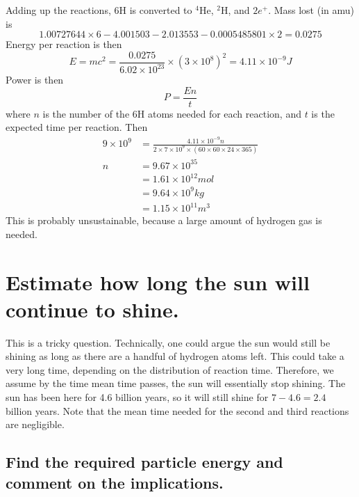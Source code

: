 \documentclass[answers]{exam}
\begin{document}
\begin{questions}
\begin{parts}
\begin{solution}
    Adding up the reactions, 6H is converted to $^4$He, $^2$H, and $2e^+$. Mass lost (in amu) is
    $$1.00727644 \times 6 - 4.001503 - 2.013553 - 0.0005485801 \times 2 = 0.0275$$
    Energy per reaction is then
    $$E = mc^2 = \frac{0.0275}{6.02\times10^{23}} \times (3\times10^8)^2 = 4.11 \times 10^{-9}\unit{J}$$
    Power is then
    $$P = \frac{En}{t}$$
    where $n$ is the number of the 6H atoms needed for each reaction, and $t$ is the expected time per reaction. Then
    \begin{align*}
        9\times10^9 &= \frac{4.11 \times 10^{-9}n}{2\times7\times10^9\times(60 \times 60 \times 24 \times 365)} \\
        n &= 9.67 \times 10^{35} \\
          &= 1.61 \times 10^{12} \unit{mol} \\
          &= 9.64 \times 10^9\unit{kg} \\
          &= 1.15 \times 10^{11} \unit{m^3}
    \end{align*}
    This is probably unsustainable, because a large amount of hydrogen gas is needed.
\end{solution}

\part{Estimate how long the sun will continue to shine.}

\begin{solution}
    This is a tricky question. Technically, one could argue the sun would still be shining as long as there are a handful of hydrogen atoms left. This could take a very long time, depending on the distribution of reaction time. Therefore, we assume by the time mean time passes, the sun will essentially stop shining. The sun has been here for 4.6 billion years, so it will still shine for $7-4.6=2.4$ billion years. Note that the mean time needed for the second and third reactions are negligible.
\end{solution}

\end{parts}

\question{}

\begin{parts}

\part{Find the required particle energy and comment on the implications.}


\end{parts}
\end{questions}
\end{document}
